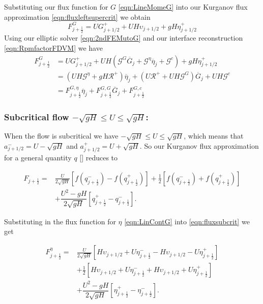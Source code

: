 Substituting our flux function for $G$ \eqref{eqn:LineMomeG} into our Kurganov flux approximation \eqref{eqn:fluxleftsupercrit} we obtain
\begin{equation*}
F^G_{j+\frac{1}{2}} =U G^+_{j+1/2} + U  H \upsilon_{j+1/2} + gH \eta^+_{j+1/2}
\end{equation*}
Using our elliptic solver \eqref{eqn:2ndFEMutoG} and our interface reconstruction \eqref{eqn:RpmfactorFDVM} we have
\begin{align}
F^G_{j+\frac{1}{2}} &=  U G^+_{j+1/2} + UH \left(\mathcal{G}^G \overline{G}_{j} + \mathcal{G}^{\eta} \overline{\eta}_{j} + \mathcal{G}^c\right) + gH \eta^+_{j+1/2} \nonumber \\ &= \left(UH \mathcal{G}^{\eta} + gH \mathcal{R}^+ \right)  \overline{\eta}_{j} + \left(U\mathcal{R}^+  +  UH \mathcal{G}^G \right) \overline{G}_{j} + UH\mathcal{G}^c \nonumber \\
&= F^{G, \eta}_{j+\frac{1}{2}} \overline{\eta}_{j} + F^{G, G}_{j+\frac{1}{2}} \overline{G}_{j} + F^{G, c}_{j+\frac{1}{2}}
\label{eqn:FluxfactorsupercritGleft}
\end{align}


\subsubsection{Subcritical flow $-\sqrt{gH} \le U \le \sqrt{gH}$:}
When the flow is subcritical we have $-\sqrt{gH} \le U \le \sqrt{gH}$, which means that $a^-_{j+ 1/2} = U - \sqrt{g H}$ and $a^+_{j+ 1/2} =  U + \sqrt{g H}$. So our Kurganov flux approximation for a general quantity $q$ [] reduces to

\begin{align}
F_{j+\frac{1}{2}} = &\frac{U}{2 \sqrt{gH}} \left[f\left(q^-_{j+\frac{1}{2}}\right) - f\left(q^+_{j+\frac{1}{2}}\right) \right]  + \frac{1}{2}\left[f\left(q^-_{j+\frac{1}{2}}\right) + f\left(q^+_{j+\frac{1}{2}}\right)\right] \nonumber \\ &+ \dfrac{U^2 - gH}{2\sqrt{g H}} \left [ q^+_{j+\frac{1}{2}} - q^-_{j+\frac{1}{2}} \right ].
\label{eqn:fluxsubcrit}
\end{align}

Substituting in the flux function for $\eta$ \eqref{eqn:LinContG} into \eqref{eqn:fluxsubcrit} we get

\begin{align}
F^\eta_{j+\frac{1}{2}} = &\frac{U}{2 \sqrt{gH}} \left[ H\upsilon_{j+1/2} + U\eta^-_{j+\frac{1}{2}} -  H\upsilon_{j+1/2} - U \eta^+_{j+\frac{1}{2}} \right]   \nonumber \\ &+ \frac{1}{2}\left[H\upsilon_{j+1/2} + U\eta^-_{j+\frac{1}{2}} +  H\upsilon_{j+1/2} + U \eta^+_{j+\frac{1}{2}}\right] \nonumber \\ &+ \dfrac{U^2 - gH}{2\sqrt{g H}} \left [ \eta^+_{j+\frac{1}{2}} - \eta^-_{j+\frac{1}{2}} \right ].
\end{align}

